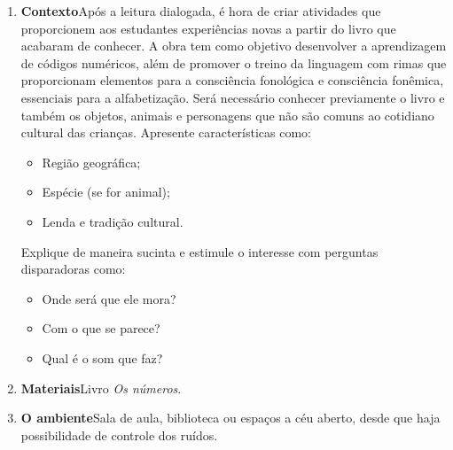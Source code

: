 \documentclass[11pt]{extarticle}
\begin{document}


\begin{enumerate}
\item \textbf{Contexto}\quad Após a leitura dialogada, é hora de criar 
atividades que proporcionem aos estudantes experiências novas a partir do livro
que acabaram de conhecer.
A obra tem como objetivo desenvolver a aprendizagem de códigos numéricos, além de promover o treino da linguagem com rimas que proporcionam elementos para a consciência fonológica e consciência fonêmica, essenciais para a alfabetização. Será necessário conhecer previamente  o livro e também os objetos, animais e personagens que não são comuns ao cotidiano cultural das crianças.  Apresente características como:

\begin{itemize}
\item Região geográfica;

\item Espécie (se for animal);

\item Lenda e tradição cultural.
\end{itemize} 

Explique de maneira sucinta e estimule o interesse com perguntas disparadoras como:

\begin{itemize}
\item Onde será que ele mora?

\item Com o que se parece?

\item Qual é o som que faz? 
\end{itemize} 

\item \textbf{Materiais}\quad Livro \textit{Os números}.

\item \textbf{O ambiente}\quad Sala de aula, biblioteca ou espaços a céu aberto, desde que haja possibilidade de controle dos ruídos. 


\end{enumerate}
\end{document}
